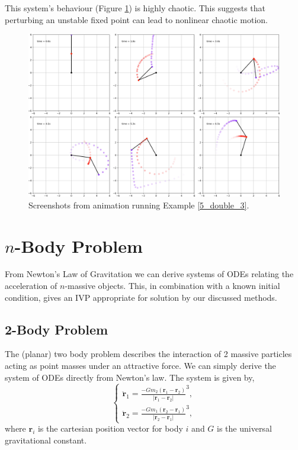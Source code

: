 \documentclass[12pt, twoside]{report}
\theoremstyle{plain}
\theoremstyle{definition}
\theoremstyle{definition}
\providecommand{\abs}[1]{\lvert#1\rvert}
\begin{document}
            This system's behaviour (Figure \ref{5_d3}) is highly chaotic. 
            This suggests that perturbing an unstable fixed point can lead to
            nonlinear chaotic motion.

            \begin{figure}[H]
                \centering
                    \includegraphics[width=\columnwidth]{double_3}
                    \caption{Screenshots from animation running Example 
                    \ref{5_double_3}.}
                    \label{5_d3}
            \end{figure}

    \section{$n$-Body Problem}
    \label{5_nbody}
        From Newton's Law of Gravitation we can derive systems of ODEs relating the
        acceleration of $n$-massive objects. This, in combination with a known 
        initial condition, gives an IVP appropriate for solution by our discussed
        methods.

        \subsection{2-Body Problem}
        \label{5_2body}
            The (planar) two body problem describes the interaction of 2 massive particles
            acting as point masses under an attractive force. We can simply derive
            the system of ODEs directly from Newton's law. The system is given by,
            \begin{equation}
                \begin{cases}
                    \ddot{\mathbf{r}}_{1} = \frac{-Gm_2(\mathbf{r}_1 - \mathbf{r}_2)}{\abs{\mathbf{r}_1 - \mathbf{r}_2}}^3,\\
                    \ddot{\mathbf{r}}_{2} = \frac{-Gm_1(\mathbf{r}_2 - \mathbf{r}_1)}{\abs{\mathbf{r}_2 - \mathbf{r}_1}}^3,
                \end{cases}
            \label{eq:2_bod}
            \end{equation}
            where $\mathbf{r}_i$ is the cartesian position vector for body $i$ and $G$ is 
            the universal gravitational constant. 
\end{document}
